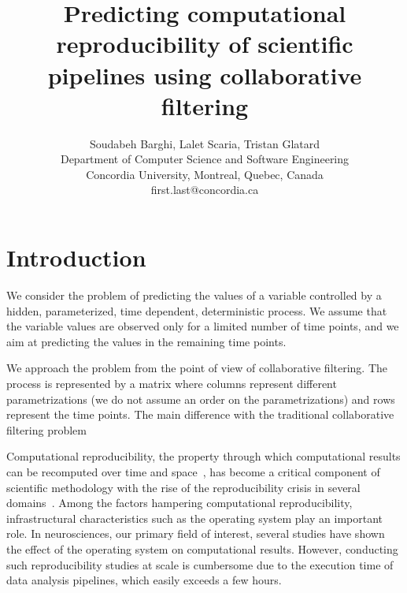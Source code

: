 \documentclass[10pt, conference, compsocconf]{IEEEtran}
\begin{document}
\title{Predicting computational reproducibility of scientific pipelines using collaborative filtering}

\author{Soudabeh Barghi, Lalet Scaria, Tristan Glatard\\
  Department of Computer Science and Software Engineering\\ Concordia University, Montreal, Quebec, Canada\\
  {first.last}@concordia.ca}

\maketitle

\begin{abstract}
\end{abstract}


\section{Introduction}

We consider the problem of predicting the values of a variable 
controlled by a hidden, parameterized, time dependent, deterministic 
process. We assume that the variable values are observed only for 
a limited number of time points, and we aim at predicting the values in the remaining time points.

We approach the problem from the point of view of collaborative 
filtering. The process is represented by a matrix where columns 
represent different parametrizations (we do not assume an order on the 
parametrizations) and rows represent the time points. The main difference with the traditional 
collaborative filtering problem 


Computational reproducibility, the property through which
computational results can be recomputed over time and
space~\cite{stodden}, has become a critical component of scientific
methodology with the rise of the reproducibility crisis in several
domains~\cite{xxx}. Among the factors hampering computational
reproducibility, infrastructural characteristics such as the operating
system play an important role. In neurosciences, our primary field of
interest, several studies have shown the effect of the operating
system on computational results. However, conducting such
reproducibility studies at scale is cumbersome due to the execution
time of data analysis pipelines, which easily exceeds a few hours.
\end{document}
